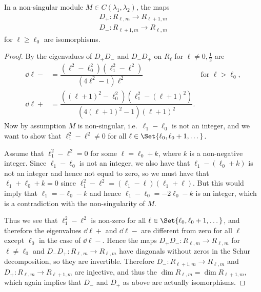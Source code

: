 \begin{lemma}\label{lem:Disos}
  In a non-singular module $M\in C(\lambda_1,\lambda_2)$, the maps
  \begin{align*}
    D_+\colon R_{\ell,m} \to R_{\ell+1,m} \\
    D_-\colon R_{\ell+1,m} \to R_{\ell,m}
  \end{align*}
  for $\ell\geq \ell_0$ are isomorphisms. 
\end{lemma}
\begin{proof}
  By  the eigenvalues of $D_+D_-$ and $D_-D_+$ on $R_\ell$ for $\ell\neq 0,\tfrac{1}{2}$ are
  \begin{align*}
    \dd{\ell}{-} &= \dfrac{(\ell^2-\ell_0^2)(\ell_1^2-\ell^2)}{(4\ell^2-1)\ell^2} & \mbox{for }\ell>\ell_0,\\
    \dd{\ell}{+} &= \dfrac{((\ell+1)^2-\ell_0^2)(\ell_1^2-(\ell+1)^2)}{(4(\ell+1)^2-1)(\ell+1)^2}.
  \end{align*}
  Now by assumption $M$ is non-singular, i.e.\ $\ell_1-\ell_0$ is not an integer, and we want to show that $\ell_1^2-\ell^2\neq 0$ for all $\ell\in \Set{\ell_0,\ell_0+1,\dotsc}$.

  Assume that $\ell_1^2-\ell^2=0$ for some $\ell=\ell_0+k$, where $k$ is a non-negative integer. Since $\ell_1-\ell_0$ is not an integer, we also have that $\ell_1-(\ell_0+k)$ is not an integer and hence not equal to zero, so we must have that $\ell_1+\ell_0+k=0$ since $\ell_1^2-\ell^2=(\ell_1-\ell)(\ell_1+\ell)$. But this would imply that $\ell_1=-\ell_0-k$ and hence $\ell_1-\ell_0=-2\ell_0-k$ is an integer, which is a contradiction with the non-singularity of $M$.

  Thus we see that $\ell_1^2-\ell^2$ is non-zero for all $\ell\in \Set{\ell_0,\ell_0+1,\dotsc}$, and therefore the eigenvalues $\dd{\ell}{+}$ and $\dd{\ell}{-}$ are different from zero for all $\ell$ except $\ell_0$ in the case of $\dd{\ell}{-}$. Hence the maps $D_+D_-\colon R_{\ell,m}\to R_{\ell,m}$ for $\ell\neq\ell_0$ and $D_-D_+\colon R_{\ell,m}\to R_{\ell,m}$ have diagonals without zeros in the Schur decomposition, so they are invertible. Therefore $D_-\colon R_{\ell+1,m}\to R_{\ell,m}$ and $D_+\colon R_{\ell,m}\to R_{\ell+1,m}$ are injective, and thus the $\dim R_{\ell,m} = \dim R_{\ell+1,m}$, which again implies that $D_-$ and $D_+$ as above are actually isomorphisms.
\end{proof}

